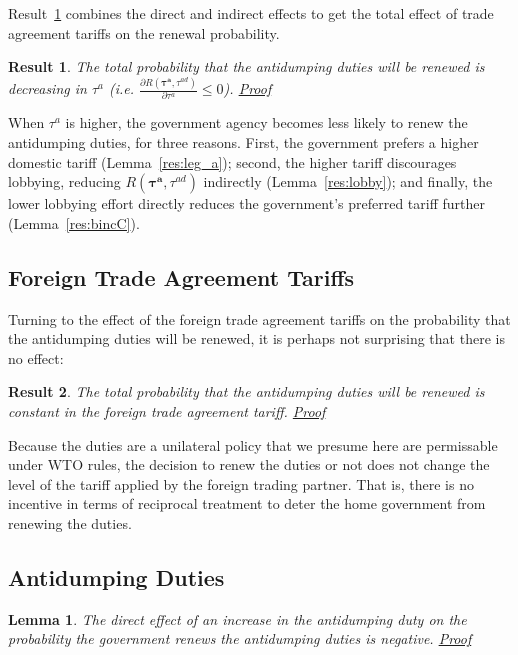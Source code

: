 \documentclass[10pt]{article}
\newtheorem{lemma}{Lemma}
\newtheorem{result}{Result}
\newcommand{\bta}{\bm{\tau^a}}
\newcommand{\tad}{\tau^{ad}}
\begin{document}
Result~\ref{res:bcomB} combines the direct and indirect effects to get the total effect of trade agreement tariffs on the renewal probability.

\begin{result}
	The total probability that the antidumping duties will be renewed is decreasing in $\tau^a$ (i.e. $\frac{\partial R(\bta,\tad)}{\partial  \tau^a} \leq 0$). \hyperlink{Pr_bcomB}{Proof}
	\label{res:bcomB}
\end{result}

\noindent When $\tau^a$ is higher, the government agency becomes less likely to renew the antidumping duties, for three reasons. First, the government prefers a higher domestic tariff (Lemma~\ref{res:leg_a}); second, the higher tariff discourages lobbying, reducing $R(\bta,\tad)$ indirectly (Lemma~\ref{res:lobby}); and finally, the lower lobbying effort directly reduces the government's preferred tariff further (Lemma~\ref{res:bincC}).


\bigskip
\subsection{Foreign Trade Agreement Tariffs}
\label{sec:foreign}

Turning to the effect of the foreign trade agreement tariffs on the probability that the antidumping duties will be renewed, it is perhaps not surprising that there is no effect:
\begin{result}
  The total probability that the antidumping duties will be renewed is constant in the foreign trade agreement tariff. \hyperlink{Pr_astar}{Proof}
  \label{res:leg_astar}
\end{result}

Because the duties are a unilateral policy that we presume here are permissable under WTO rules, the decision to renew the duties or not does not change the level of the tariff applied by the foreign trading partner. That is, there is no incentive in terms of reciprocal treatment to deter the home government from renewing the duties.


\bigskip
\subsection{Antidumping Duties}
\label{sec:tad}


\begin{lemma}
  The direct effect of an increase in the antidumping duty on the probability the government renews the antidumping duties is negative. \hyperlink{Pr_tad_dir}{Proof}
  \label{res:tad_dir}
\end{lemma}
\end{document}
